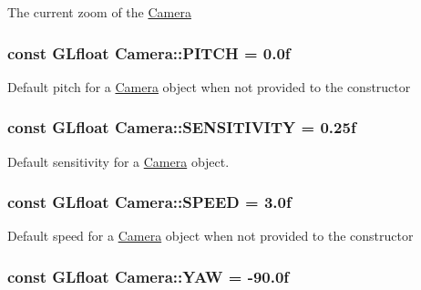 The current zoom of the \hyperlink{classCamera}{Camera} \hypertarget{classCamera_afd43f32a47d2db8922dc32030fd84379}{
\subsubsection[{P\-I\-T\-C\-H}]{\setlength{\rightskip}{0pt plus 5cm}const G\-Lfloat Camera\-::\-P\-I\-T\-C\-H = 0.\-0f\hspace{0.3cm}{\ttfamily [static]}}}\label{classCamera_afd43f32a47d2db8922dc32030fd84379}
Default pitch for a \hyperlink{classCamera}{Camera} object when not provided to the constructor \hypertarget{classCamera_adee09ae2133f9fe95a6eb72a6cb8db20}{
\subsubsection[{S\-E\-N\-S\-I\-T\-I\-V\-I\-T\-Y}]{\setlength{\rightskip}{0pt plus 5cm}const G\-Lfloat Camera\-::\-S\-E\-N\-S\-I\-T\-I\-V\-I\-T\-Y = 0.\-25f\hspace{0.3cm}{\ttfamily [static]}}}\label{classCamera_adee09ae2133f9fe95a6eb72a6cb8db20}
Default sensitivity for a \hyperlink{classCamera}{Camera} object. \hypertarget{classCamera_acc2ddbb4a3bdb2829896703edf72ca1e}{
\subsubsection[{S\-P\-E\-E\-D}]{\setlength{\rightskip}{0pt plus 5cm}const G\-Lfloat Camera\-::\-S\-P\-E\-E\-D = 3.\-0f\hspace{0.3cm}{\ttfamily [static]}}}\label{classCamera_acc2ddbb4a3bdb2829896703edf72ca1e}
Default speed for a \hyperlink{classCamera}{Camera} object when not provided to the constructor \hypertarget{classCamera_a79050e94e98c5c1cc0127c41edb4ed16}{
\subsubsection[{Y\-A\-W}]{\setlength{\rightskip}{0pt plus 5cm}const G\-Lfloat Camera\-::\-Y\-A\-W = -\/90.\-0f\hspace{0.3cm}{\ttfamily [static]}}}\label{classCamera_a79050e94e98c5c1cc0127c41edb4ed16}
